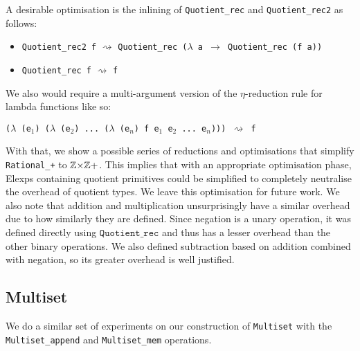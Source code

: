 \documentclass[12pt,twoside,maitrise]{dms}
\theoremstyle{definition}
\numberwithin{equation}{section}
\numberwithin{table}{chapter}
\numberwithin{figure}{chapter}
\newcommand\id[1] {\texttt{#1}}
\newcommand\fn[1] {\texttt{#1}}
\begin{document}
A desirable optimisation is the inlining of \id{Quotient\_rec} and
\id{Quotient\_rec2} as follows:

\begin{itemize}
  \item{\fn{Quotient\_rec2 f} $\rightsquigarrow$ \fn{Quotient\_rec ($\lambda$ a $\rightarrow$ Quotient\_rec (f a))}}

  \item{\fn{Quotient\_rec f} $\rightsquigarrow$ \id{f}}
\end{itemize}

We also would require a multi-argument version of the $\eta$-reduction rule for
lambda functions like so:

\fn{($\lambda$ (e$_1$) ($\lambda$ (e$_2$) ... ($\lambda$ (e$_n$) f e$_1$ e$_2$ ... e$_n$))) $\rightsquigarrow$ f}

With that, we show a possible series of reductions and optimisations that
simplify \fn{Rational\_+} to $\mathbb{Z}{\times}\mathbb{Z}+$. This implies that with an appropriate
optimisation phase, Elexps containing quotient primitives could be simplified to
completely neutralise the overhead of quotient types. We leave
this optimisation for future work. We also note that addition and multiplication
unsurprisingly have a similar overhead due to how similarly they are defined.
Since negation is a unary operation, it was defined directly using
$\fn{Quotient\_rec}$ and thus has a lesser overhead than the other binary
operations. We also defined subtraction based on
addition combined with negation, so its greater overhead is well justified.

\subsection*{Multiset}

We do a similar set of experiments on our construction of \id{Multiset} with the
\id{Multiset\_append} and \id{Multiset\_mem} operations.
\end{document}
